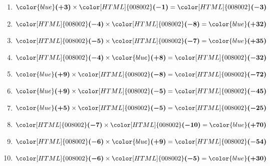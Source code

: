 \begin{Correction}
\begin{EXO}{}{}
\begin{enumerate}[itemsep=1em]
	\item $ {\color{blue}\boldsymbol{(+3)}} \times {\color[HTML]{008002}\boldsymbol{(-1)}} = {\color[HTML]{008002}\boldsymbol{(-3)}} $
	\item $ {\color[HTML]{008002}\boldsymbol{(-4)}} \times {\color[HTML]{008002}\boldsymbol{(-8)}} = {\color{blue}\boldsymbol{(+32)}} $
	\item $ {\color[HTML]{008002}\boldsymbol{(-5)}} \times {\color[HTML]{008002}\boldsymbol{(-7)}} = {\color{blue}\boldsymbol{(+35)}} $
	\item $ {\color[HTML]{008002}\boldsymbol{(-4)}} \times {\color{blue}\boldsymbol{(+8)}} = {\color[HTML]{008002}\boldsymbol{(-32)}} $
	\item $ {\color{blue}\boldsymbol{(+9)}} \times {\color[HTML]{008002}\boldsymbol{(-8)}} = {\color[HTML]{008002}\boldsymbol{(-72)}} $
	\item $ {\color{blue}\boldsymbol{(+9)}} \times {\color[HTML]{008002}\boldsymbol{(-5)}} = {\color[HTML]{008002}\boldsymbol{(-45)}} $
	\item $ {\color{blue}\boldsymbol{(+5)}} \times {\color[HTML]{008002}\boldsymbol{(-5)}} = {\color[HTML]{008002}\boldsymbol{(-25)}} $
	\item $ {\color[HTML]{008002}\boldsymbol{(-7)}} \times {\color[HTML]{008002}\boldsymbol{(-10)}} = {\color{blue}\boldsymbol{(+70)}} $
	\item $ {\color[HTML]{008002}\boldsymbol{(-6)}} \times {\color{blue}\boldsymbol{(+9)}} = {\color[HTML]{008002}\boldsymbol{(-54)}} $
	\item $ {\color[HTML]{008002}\boldsymbol{(-6)}} \times {\color[HTML]{008002}\boldsymbol{(-5)}} = {\color{blue}\boldsymbol{(+30)}} $
\end{enumerate}
\end{EXO}

\clearpage
\end{Correction}


